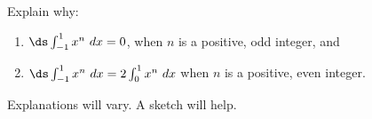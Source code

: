 {Explain why:
\begin{enumerate}
\item		$\ds \int_{-1}^1 x^n\ dx=0$, when $n$ is a positive, odd integer, and 
\item		$\ds \int_{-1}^1 x^n\ dx = 2\int_{0}^1 x^n\ dx$ when $n$ is a positive, even integer.
\end{enumerate}
}
{Explanations will vary. A sketch will help.
}

